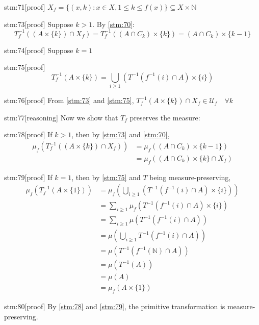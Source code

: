 \documentclass{article}
\begin{document}
\begin{stm}{stm:71}[proof]
$X_f = \{(x,k) : x \in X, 1 \le k \le f(x)\} \subseteq X \times \mathbb{N}$
\end{stm}

\begin{stm}{stm:73}[proof]
Suppose $k > 1$. By \ref{stm:70}:
\[
T_f^{-1}((A \times \{k\}) \cap X_f) = T_f^{-1}((A \cap C_k) \times \{k\}) = (A \cap C_k) \times \{k-1\}
\]
\end{stm}

\begin{stm}{stm:74}[proof]
Suppose $k = 1$
\end{stm}

\begin{stm}{stm:75}[proof]
\[
T_f^{-1}(A \times \{k\}) = \bigcup_{i \ge 1} (T^{-1}(f^{-1}(i) \cap A) \times \{i\})
\]
\end{stm}

\begin{stm}{stm:76}[proof]
From \ref{stm:73} and \ref{stm:75}, $T_f^{-1}(A \times \{k\}) \cap X_f \in \mathcal{U}_f \quad \forall k$
\end{stm}

\begin{stm}{stm:77}[reasoning]
Now we show that $T_f$ preserves the measure:
\end{stm}

\begin{stm}{stm:78}[proof]
If $k > 1$, then by \ref{stm:73} and \ref{stm:70},
\begin{align*}
\mu_f(T_f^{-1}((A \times \{k\}) \cap X_f)) &= \mu_f((A \cap C_k) \times \{k-1\}) \\
&= \mu_f((A \cap C_k) \times \{k\} \cap X_f)
\end{align*}
\end{stm}

\begin{stm}{stm:79}[proof]
If $k = 1$, then by \ref{stm:75} and $T$ being measure-preserving,
\begin{align*}
\mu_f(T_f^{-1}(A \times \{1\})) &= \mu_f\left(\bigcup_{i \ge 1} (T^{-1}(f^{-1}(i) \cap A) \times \{i\})\right) \\
&= \sum_{i \ge 1} \mu_f(T^{-1}(f^{-1}(i) \cap A) \times \{i\}) \\
&= \sum_{i \ge 1} \mu(T^{-1}(f^{-1}(i) \cap A)) \\
&= \mu\left(\bigcup_{i \ge 1} T^{-1}(f^{-1}(i) \cap A)\right) \\
&= \mu(T^{-1}(f^{-1}(\mathbb{N}) \cap A)) \\
&= \mu(T^{-1}(A)) \\
&= \mu(A) \\
&= \mu_f(A \times \{1\})
\end{align*}
\end{stm}


\begin{stm}{stm:80}[proof]
By \ref{stm:78} and \ref{stm:79}, the primitive transformation is measure-preserving.
\end{stm}
\end{document}
